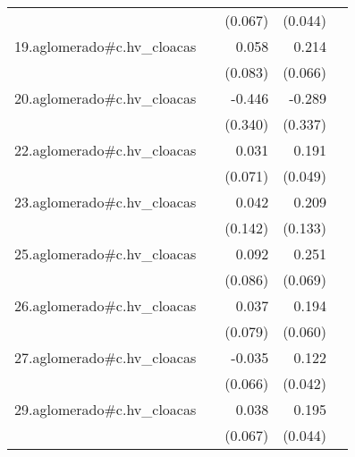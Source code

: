 {\begin{longtable}{l*{4}{D{.}{.}{-1}}}
            &                     &     (0.067)         &     (0.044)         &                     \\
\addlinespace
19.aglomerado#c.hv\_cloacas&                     &       0.058         &       0.214\sym{**} &                     \\
            &                     &     (0.083)         &     (0.066)         &                     \\
\addlinespace
20.aglomerado#c.hv\_cloacas&                     &      -0.446         &      -0.289         &                     \\
            &                     &     (0.340)         &     (0.337)         &                     \\
\addlinespace
22.aglomerado#c.hv\_cloacas&                     &       0.031         &       0.191\sym{***}&                     \\
            &                     &     (0.071)         &     (0.049)         &                     \\
\addlinespace
23.aglomerado#c.hv\_cloacas&                     &       0.042         &       0.209         &                     \\
            &                     &     (0.142)         &     (0.133)         &                     \\
\addlinespace
25.aglomerado#c.hv\_cloacas&                     &       0.092         &       0.251\sym{***}&                     \\
            &                     &     (0.086)         &     (0.069)         &                     \\
\addlinespace
26.aglomerado#c.hv\_cloacas&                     &       0.037         &       0.194\sym{**} &                     \\
            &                     &     (0.079)         &     (0.060)         &                     \\
\addlinespace
27.aglomerado#c.hv\_cloacas&                     &      -0.035         &       0.122\sym{**} &                     \\
            &                     &     (0.066)         &     (0.042)         &                     \\
\addlinespace
29.aglomerado#c.hv\_cloacas&                     &       0.038         &       0.195\sym{***}&                     \\
            &                     &     (0.067)         &     (0.044)         &                     \\

\end{longtable}}
